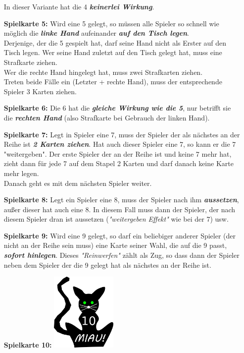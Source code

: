 \documentclass{article}
\begin{document}
\begin{itemize}
In dieser Variante hat die 4 \textit{\textbf{keinerlei Wirkung}}.
\item[\textbf{Spielkarte 5:}]
Wird eine 5 gelegt, so müssen alle Spieler so schnell wie möglich die \textit{\textbf{linke Hand}} aufeinander \textit{\textbf{auf den Tisch legen}}. \\
Derjenige, der die 5 gespielt hat, darf seine Hand nicht als Erster auf den Tisch legen. Wer seine Hand zuletzt auf den Tisch gelegt hat, muss eine Strafkarte ziehen. \\
Wer die rechte Hand hingelegt hat, muss zwei Strafkarten ziehen.\\ Treten beide Fälle ein (Letzter + rechte Hand), muss der entsprechende Spieler 3 Karten ziehen.
\item[\textbf{Spielkarte 6:}]
Die 6 hat die \textit{\textbf{gleiche Wirkung wie die 5}}, nur betrifft sie die \textit{\textbf{rechten Hand}} (also Strafkarte bei Gebrauch der linken Hand).
\item[\textbf{Spielkarte 7:}] 
Legt in Spieler eine 7, muss der Spieler der als nächstes an der Reihe ist \textit{\textbf{2 Karten ziehen}}. Hat auch dieser Spieler eine 7, so kann er die 7 "weitergeben". Der erste Spieler der an der Reihe ist und keine 7 mehr hat, zieht dann für jede 7 auf dem Stapel 2 Karten und darf danach keine Karte mehr legen. \\
Danach geht es mit dem nächsten Spieler weiter.
\item[\textbf{Spielkarte 8:}]
Legt ein Spieler eine 8, muss der Spieler nach ihm \textit{\textbf{aussetzen}}, außer dieser hat auch eine 8. In diesem Fall muss dann der Spieler, der nach diesem Spieler dran ist aussetzen (\textit{"weitergeben
Effekt"} wie bei der 7) usw.
\item[\textbf{Spielkarte 9:}]
Wird eine 9 gelegt, so darf ein beliebiger anderer Spieler (der nicht an der Reihe sein muss) eine Karte seiner Wahl, die auf die 9 passt, \textit{\textbf{sofort hinlegen}}. Dieses
\textit{"Reinwerfen"} zählt als Zug, so dass dann der Spieler neben dem Spieler der die 9 gelegt hat als nächstes an der Reihe ist.
\item[\textbf{Spielkarte 10:}]
\includegraphics[width=0.25\textwidth]{photos/cat.png}

\end{itemize}
\end{document}
